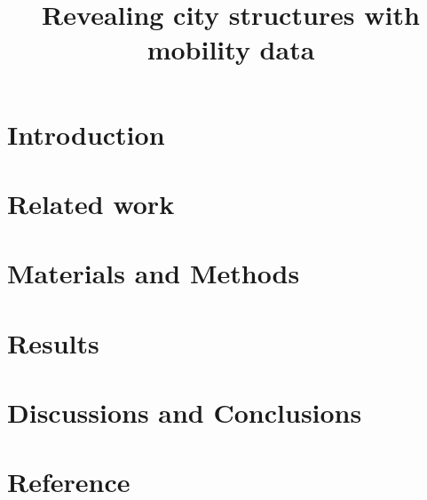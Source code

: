 \documentclass[a4paper]{article}
\begin{document}
\title{Revealing city structures with mobility data}
\maketitle



\section{Introduction}

\section{Related work}

\section{Materials and Methods}

\section{Results}

\section{Discussions and Conclusions}

\section{Reference}
\end{document}
